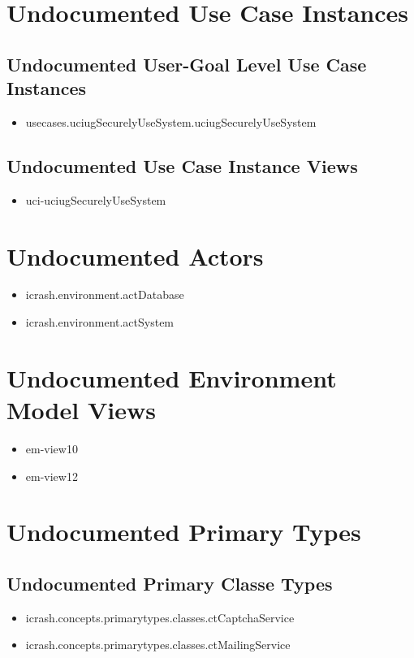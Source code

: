 \section[Undocumented Use Case Instances]{Undocumented Use Case Instances}


\subsection[Undocumented Use Case Instances - User-Goal Level]{Undocumented User-Goal Level Use Case Instances}
\begin{itemize}
\item usecases.uciugSecurelyUseSystem.uciugSecurelyUseSystem 
\end{itemize}


\subsection[Undocumented Use Case Instance Views]{Undocumented Use Case Instance Views}
\begin{itemize}
\item uci-uciugSecurelyUseSystem 
\end{itemize}


\section[Undocumented Actors]{Undocumented Actors}
\begin{itemize}
\item icrash.environment.actDatabase 
\item icrash.environment.actSystem 
\end{itemize}


\section[Undocumented Environment Model Views]{Undocumented Environment Model Views}
\begin{itemize}
\item em-view10 
\item em-view12 
\end{itemize}


\section[Undocumented Primary Types]{Undocumented Primary Types}

\subsection[Undocumented Primary Classe Types]{Undocumented Primary Classe Types}
\begin{itemize}
\item icrash.concepts.primarytypes.classes.ctCaptchaService 
\item icrash.concepts.primarytypes.classes.ctMailingService 
\end{itemize}

